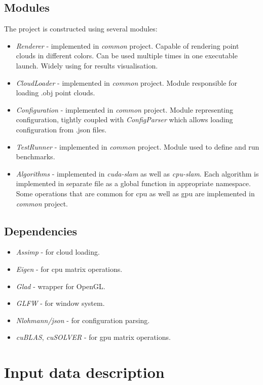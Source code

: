 \documentclass[titlepage]{article}
\begin{document}
\subsection{Modules}
The project is constructed using several modules:
\begin{itemize}
\item \textit{Renderer} - implemented in \textit{common} project. Capable of rendering point clouds in different colors. Can be used multiple times in one executable launch. Widely using for results visualisation.
\item \textit{CloudLoader} - implemented in \textit{common} project. Module responsible for loading .obj point clouds.
\item \textit{Configuration} - implemented in \textit{common} project. Module representing configuration, tightly coupled with \textit{ConfigParser} which allows loading configuration from .json files.
\item \textit{TestRunner} - implemented in \textit{common} project. Module used to define and run benchmarks.
\item \textit{Algorithms} - implemented in \textit{cuda-slam} as well as \textit{cpu-slam}. Each algorithm is implemented in separate file as a global function in appropriate namespace. Some operations that are common for cpu as well as gpu are implemented in \textit{common} project.
\end{itemize}

\subsection{Dependencies}
\begin{itemize}
\item \textit{Assimp} - for cloud loading.
\item \textit{Eigen} - for cpu matrix operations.
\item \textit{Glad} - wrapper for OpenGL.
\item \textit{GLFW} - for window system.
\item \textit{Nlohmann/json} - for configuration parsing.
\item \textit{cuBLAS}, \textit{cuSOLVER} - for gpu matrix operations.
\end{itemize}

\section{Input data description}
\end{document}
